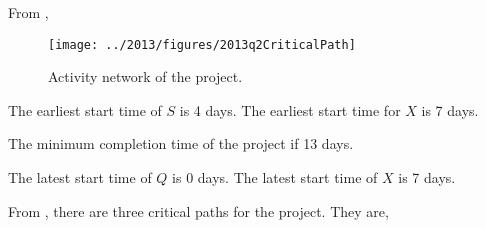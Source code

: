 %
%

\begin{subquestions}


\subquestion

From ,

\begin{figure}
	\begin{center}
		\texttt{[image: ../2013/figures/2013q2CriticalPath]}
		\caption{\label{2013:q2:fig:ActNet} Activity network of the project.}
	\end{center}
\end{figure}




\begin{subsubquestions}

\subsubquestion 

The earliest start time of $S$ is 4 days. The earliest start time for $X$ is 7 days.


\subsubquestion

The minimum completion time of the project if 13 days.


\subsubquestion

The latest start time of $Q$ is 0 days. The latest start time of $X$ is 7 days.


\subsubquestion

From , there are three critical paths for the project. They are,


\end{subsubquestions}
\end{subquestions}
